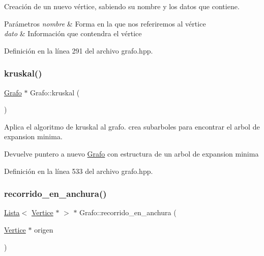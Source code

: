 Creación de un nuevo vértice, sabiendo su nombre y los datos que contiene. 


\begin{DoxyParams}{Parámetros}
{\em nombre} & Forma en la que nos referiremos al vértice \\
\hline
{\em dato} & Información que contendra el vértice \\
\hline
\end{DoxyParams}


Definición en la línea 291 del archivo grafo.\+hpp.

\mbox{\label{classGrafo_aa2ab9a12d473f6830af554efad5b438d}} 
\subsubsection{\texorpdfstring{kruskal()}{kruskal()}}
{\footnotesize\ttfamily \hyperlink{classGrafo}{Grafo} $\ast$ Grafo\+::kruskal (\begin{DoxyParamCaption}{ }\end{DoxyParamCaption})}



Aplica el algoritmo de kruskal al grafo. crea subarboles para encontrar el arbol de expansion minima. 

\begin{DoxyReturn}{Devuelve}
puntero a nuevo \hyperlink{classGrafo}{Grafo} con estructura de un arbol de expansion minima 
\end{DoxyReturn}


Definición en la línea 533 del archivo grafo.\+hpp.

\mbox{\label{classGrafo_a1c65e0f7cbbf74cd690b5eddf220728d}} 
\subsubsection{\texorpdfstring{recorrido\+\_\+en\+\_\+anchura()}{recorrido\_en\_anchura()}}
{\footnotesize\ttfamily \hyperlink{classLista}{Lista}$<$ \hyperlink{classVertice}{Vertice} $\ast$ $>$ $\ast$ Grafo\+::recorrido\+\_\+en\+\_\+anchura (\begin{DoxyParamCaption}\item[{\hyperlink{classVertice}{Vertice} $\ast$}]{origen }\end{DoxyParamCaption})}




